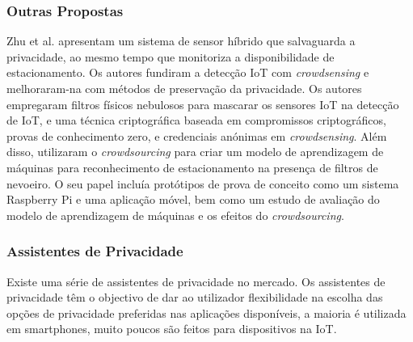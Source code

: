 \documentclass[conference]{IEEEtran}
\begin{document}
\subsubsection{Outras Propostas}

Zhu et al. \cite{ZhuIntegrating} apresentam um sistema de sensor híbrido que
salvaguarda a privacidade, ao mesmo tempo que monitoriza a disponibilidade de
estacionamento. Os autores fundiram a detecção IoT com \textit{crowdsensing}
e melhoraram-na com métodos de preservação da privacidade. Os autores empregaram
filtros físicos nebulosos para mascarar os sensores IoT na detecção de IoT,
e uma técnica criptográfica baseada em compromissos criptográficos, provas
de conhecimento zero, e credenciais anónimas em \textit{crowdsensing}. Além
disso, utilizaram o \textit{crowdsourcing} para criar um modelo de aprendizagem
de máquinas para reconhecimento de estacionamento na presença de filtros de
nevoeiro. O seu papel incluía protótipos de prova de conceito como um sistema
Raspberry Pi e uma aplicação móvel, bem como um estudo de avaliação do modelo
de aprendizagem de máquinas e os efeitos do \textit{crowdsourcing}.


\subsubsection{Assistentes de Privacidade}

Existe uma série de assistentes de privacidade no mercado. Os assistentes de
privacidade têm o objectivo de dar ao utilizador flexibilidade na escolha das
opções de privacidade preferidas nas aplicações disponíveis, a maioria é utilizada
em smartphones, muito poucos são feitos para dispositivos na IoT.
\end{document}
